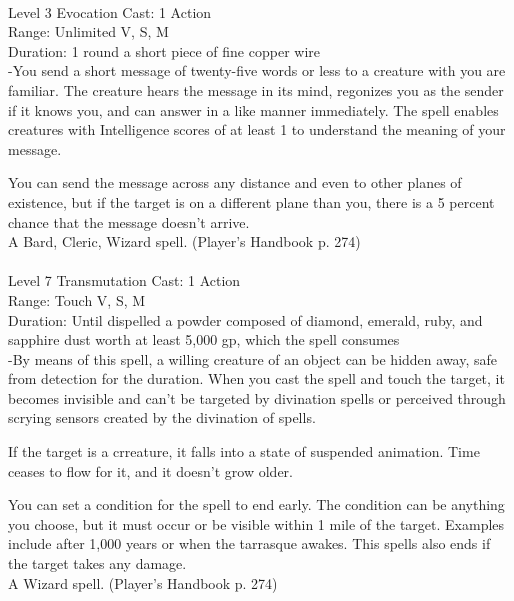 \documentclass[10pt,twocolumn]{report}
\begin{document}
 \\
Level 3 \quad Evocation \quad Cast: 1 Action\\
Range: Unlimited \quad V, S, M\\
Duration: 1 round \quad a short piece of fine copper wire\\
-You send a short message of twenty-five words or less to a creature with you are familiar. The creature hears the message in its mind, regonizes you as the sender if it knows you, and can answer in a like manner immediately. The spell enables creatures with Intelligence scores of at least 1 to understand the meaning of your message.

You can send the message across any distance and even to other planes of existence, but if the target is on a different plane than you, there is a 5 percent chance that the message doesn’t arrive.\\
A Bard, Cleric, Wizard spell. (Player's Handbook p. 274) \\


 \\
Level 7 \quad Transmutation \quad Cast: 1 Action\\
Range: Touch \quad V, S, M\\
Duration: Until dispelled \quad a powder composed of diamond, emerald, ruby, and sapphire dust worth at least 5,000 gp, which the spell consumes\\
-By means of this spell, a willing creature of an object can be hidden away, safe from detection for the duration.
When you cast the spell and touch the target, it becomes invisible and can’t be targeted by divination spells or perceived through scrying sensors created by the divination of spells.

If the target is a crreature, it falls into a state of suspended animation. Time ceases to flow for it, and it doesn’t grow older.

You can set a condition for the spell to end early. The condition can be anything you choose, but it must occur or be visible within 1 mile of the target. Examples include after 1,000 years or when the tarrasque awakes. This spells also ends if the target takes any damage.\\
A Wizard spell. (Player's Handbook p. 274) \\
\end{document}
